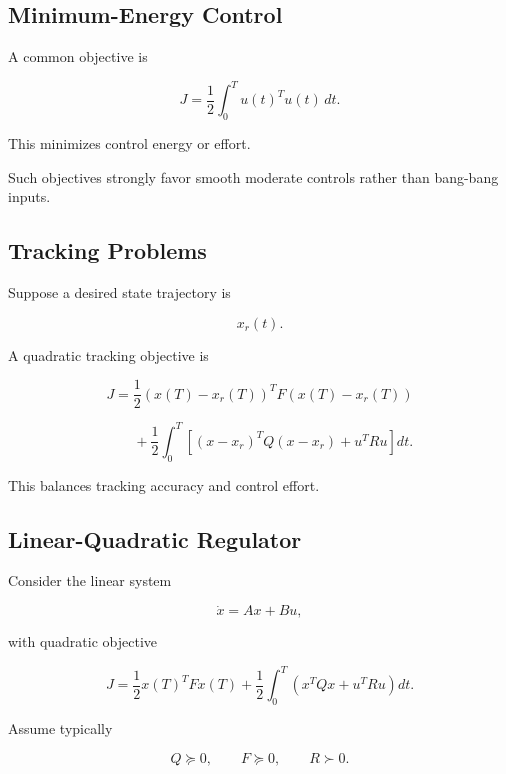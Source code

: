 \subsection{Minimum-Energy Control}
\label{subsec:minimum-energy-control}

A common objective is

\[
\boxed{
J
=
\frac12
\int_0^T
u(t)^Tu(t)
\,dt.
}
\]

This minimizes control energy or effort.

Such objectives strongly favor smooth moderate controls rather than
bang-bang inputs.

\subsection{Tracking Problems}
\label{subsec:optimal-control-tracking}

Suppose a desired state trajectory is

\[
x_r(t).
\]

A quadratic tracking objective is

\[
\boxed{
J
=
\frac12
(
x(T)-x_r(T)
)^T
F
(
x(T)-x_r(T)
)
}
\]

\[
\boxed{
\phantom{J={}}
+
\frac12
\int_0^T
\left[
(
x-x_r
)^T
Q
(
x-x_r
)
+
u^TRu
\right]dt.
}
\]

This balances tracking accuracy and control effort.

\subsection{Linear-Quadratic Regulator}
\label{subsec:linear-quadratic-regulator}

Consider the linear system

\[
\boxed{
\dot{x}
=
Ax+Bu,
}
\]

with quadratic objective

\[
\boxed{
J
=
\frac12x(T)^TFx(T)
+
\frac12
\int_0^T
\left(
x^TQx
+
u^TRu
\right)dt.
}
\]

Assume typically

\[
\boxed{
Q\succeq0,
\qquad
F\succeq0,
\qquad
R\succ0.
}
\]

